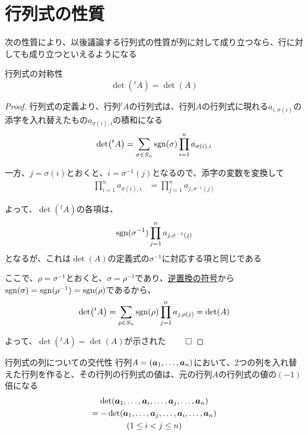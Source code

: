 \documentclass[../../../topic_linear-algebra]{subfiles}
\begin{document}
\sectionline
\section{行列式の性質}

次の性質により、以後議論する行列式の性質が列に対して成り立つなら、行に対しても成り立つといえるようになる

\begin{theorem}{行列式の対称性}\label{thm:determinant-transpose-invariance}
  \begin{equation*}
    \det({}^t A) = \det(A)
  \end{equation*}
\end{theorem}

\begin{proof}
  行列式の定義より、行列${}^tA$の行列式は、行列$A$の行列式に現れる$a_{i,\sigma(i)}$の添字を入れ替えたもの$a_{\sigma(i),i}$の積和になる
  \begin{equation*}
    \det({}^t A) = \sum_{\sigma \in S_n} \operatorname{sgn}(\sigma) \prod_{i=1}^n a_{\sigma(i),i}
  \end{equation*}

  一方、$j=\sigma(i)$とおくと、$i = \sigma^{-1}(j)$となるので、添字の変数を変換して
  \begin{align*}
    \prod_{i=1}^n a_{\sigma(i),i}
     & = \prod_{j=1}^n a_{j,\sigma^{-1}(j)}
  \end{align*}

  よって、$\det({}^t A)$の各項は、
  \begin{equation*}
    \operatorname{sgn}(\sigma^{-1}) \prod_{j=1}^n a_{j,\sigma^{-1}(j)}
  \end{equation*}
  となるが、これは$\det(A)$の定義式の$\sigma^{-1}$に対応する項と同じである

  \br

  ここで、$\rho = \sigma^{-1}$とおくと、$\sigma = \rho^{-1}$であり、\hyperref[thm:sign-of-inverse-permutation]{逆置換の符号}から$\operatorname{sgn}(\sigma) = \operatorname{sgn}(\rho^{-1}) = \operatorname{sgn}(\rho)$であるから、
  \begin{equation*}
    \det({}^t A) = \sum_{\rho \in S_n} \operatorname{sgn}(\rho) \prod_{j=1}^n a_{j,\rho(j)}  = \det(A)
  \end{equation*}

  よって、$\det({}^t A) = \det(A)$が示された $\qed$
\end{proof}

\sectionline

\begin{theorem}{行列式の列についての交代性}
  行列$A = (\vb*{a}_1, \ldots, \vb*{a}_n)$において、2つの列を入れ替えた行列を作ると、その行列の行列式の値は、元の行列$A$の行列式の値の$(-1)$倍になる
  \begin{multline*}
    \det(\vb*{a}_1, \ldots, \vb*{a}_i, \ldots, \vb*{a}_j, \ldots, \vb*{a}_n) \\= -\det(\vb*{a}_1, \ldots, \vb*{a}_j, \ldots, \vb*{a}_i, \ldots, \vb*{a}_n) \\ (1 \leq i < j \leq n)
  \end{multline*}
\end{theorem}
\end{document}
